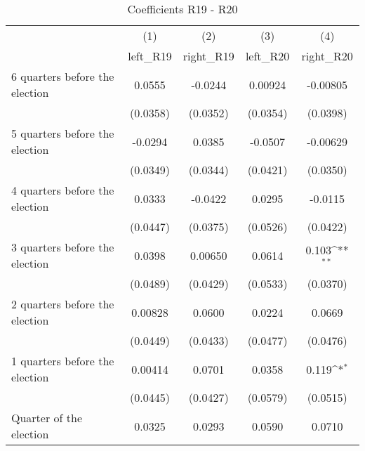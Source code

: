\begin{table}[htbp]\centering
\def\sym#1{\ifmmode^{#1}\else\(^{#1}\)\fi}
\caption{Coefficients R19 - R20}
\begin{tabular}{l*{4}{c}}
\hline\hline
                    &\multicolumn{1}{c}{(1)}&\multicolumn{1}{c}{(2)}&\multicolumn{1}{c}{(3)}&\multicolumn{1}{c}{(4)}\\
                    &\multicolumn{1}{c}{left\_R19}&\multicolumn{1}{c}{right\_R19}&\multicolumn{1}{c}{left\_R20}&\multicolumn{1}{c}{right\_R20}\\
\hline
 6 quarters before the election&      0.0555         &     -0.0244         &     0.00924         &    -0.00805         \\
                    &    (0.0358)         &    (0.0352)         &    (0.0354)         &    (0.0398)         \\
[1em]
 5 quarters before the election&     -0.0294         &      0.0385         &     -0.0507         &    -0.00629         \\
                    &    (0.0349)         &    (0.0344)         &    (0.0421)         &    (0.0350)         \\
[1em]
 4 quarters before the election&      0.0333         &     -0.0422         &      0.0295         &     -0.0115         \\
                    &    (0.0447)         &    (0.0375)         &    (0.0526)         &    (0.0422)         \\
[1em]
 3 quarters before the election&      0.0398         &     0.00650         &      0.0614         &       0.103\sym{**} \\
                    &    (0.0489)         &    (0.0429)         &    (0.0533)         &    (0.0370)         \\
[1em]
 2 quarters before the election&     0.00828         &      0.0600         &      0.0224         &      0.0669         \\
                    &    (0.0449)         &    (0.0433)         &    (0.0477)         &    (0.0476)         \\
[1em]
 1 quarters before the election&     0.00414         &      0.0701         &      0.0358         &       0.119\sym{*}  \\
                    &    (0.0445)         &    (0.0427)         &    (0.0579)         &    (0.0515)         \\
[1em]
Quarter of the election&      0.0325         &      0.0293         &      0.0590         &      0.0710         \\

\end{tabular}
\end{table}
